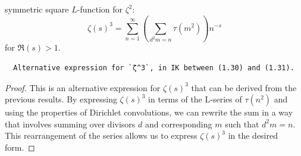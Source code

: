 \begin{theorem}
\label{zeta_pow_three_eq_alt}
\leanok
symmetric square $L$-function for $\zeta^2$:
  $$\zeta(s)^3 = \sum_{n=1}^{\infty} \left( \sum_{d^2 m = n} \tau(m^2) \right) n^{-s}$$ for $\Re(s) > 1$.
  \begin{verbatim}
  Alternative expression for `ζ^3`, in IK between (1.30) and (1.31).
  \end{verbatim}
\end{theorem}
\begin{proof}
This is an alternative expression for $\zeta(s)^3$ that can be derived from the previous results. By expressing $\zeta(s)^3$ in terms of the L-series of $\tau(n^2)$ and using the properties of Dirichlet convolutions, we can rewrite the sum in a way that involves summing over divisors $d$ and corresponding $m$ such that $d^2 m = n$. This rearrangement of the series allows us to express $\zeta(s)^3$ in the desired form.
\end{proof}
